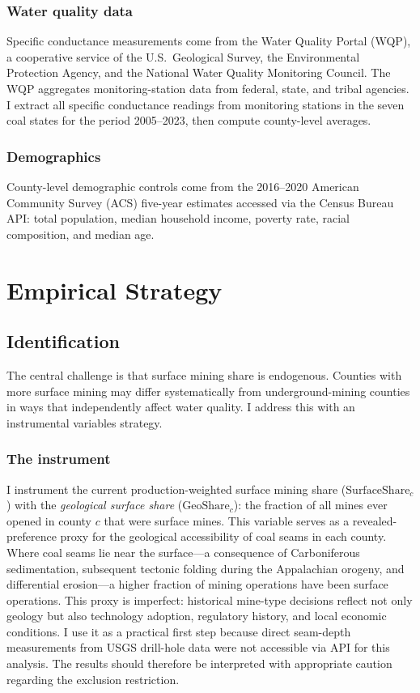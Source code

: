 \documentclass[12pt]{article}
\begin{document}
\subsubsection*{Water quality data} Specific conductance measurements come from the Water Quality Portal (WQP), a cooperative service of the U.S.\ Geological Survey, the Environmental Protection Agency, and the National Water Quality Monitoring Council. The WQP aggregates monitoring-station data from federal, state, and tribal agencies. I extract all specific conductance readings from monitoring stations in the seven coal states for the period 2005--2023, then compute county-level averages.

\subsubsection*{Demographics} County-level demographic controls come from the 2016--2020 American Community Survey (ACS) five-year estimates accessed via the Census Bureau API: total population, median household income, poverty rate, racial composition, and median age.




\section{Empirical Strategy}
\label{sec:strategy}

\subsection{Identification}

The central challenge is that surface mining share is endogenous. Counties with more surface mining may differ systematically from underground-mining counties in ways that independently affect water quality. I address this with an instrumental variables strategy.

\subsubsection*{The instrument} I instrument the current production-weighted surface mining share ($\text{SurfaceShare}_c$) with the \textit{geological surface share} ($\text{GeoShare}_c$): the fraction of all mines ever opened in county $c$ that were surface mines. This variable serves as a revealed-preference proxy for the geological accessibility of coal seams in each county. Where coal seams lie near the surface---a consequence of Carboniferous sedimentation, subsequent tectonic folding during the Appalachian orogeny, and differential erosion---a higher fraction of mining operations have been surface operations. This proxy is imperfect: historical mine-type decisions reflect not only geology but also technology adoption, regulatory history, and local economic conditions. I use it as a practical first step because direct seam-depth measurements from USGS drill-hole data were not accessible via API for this analysis. The results should therefore be interpreted with appropriate caution regarding the exclusion restriction.
\end{document}
